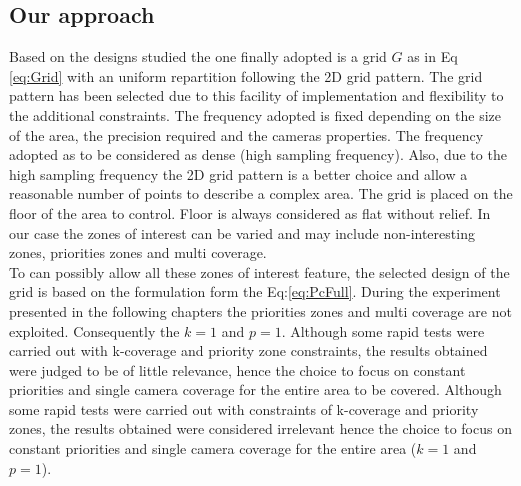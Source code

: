 \begin{landscape}
\begin{table}[!h]
 \caption{Sum-up of the grid map.}\label{tab:mapSumUp}
\end{table}	
\end{landscape}
 
\subsection{Our approach}
 Based on the designs studied the one finally adopted is a grid $G$ as in Eq \ref{eq:Grid} with an uniform repartition following the 2D grid pattern. The grid pattern has been selected due to this facility of implementation and  flexibility to the additional constraints.
  The frequency adopted is fixed depending on the size of the area, the precision required and the cameras properties. The frequency adopted as to be considered as dense (high sampling frequency).
  Also, due to the high sampling frequency the 2D grid pattern is a better choice and allow a reasonable number of points to describe a complex area. 
  The grid is placed on the floor of the area to control. Floor is always considered as flat without relief.
  In our case the zones of interest can be varied and may include non-interesting zones, priorities zones  and  multi coverage. \\
  To can possibly allow all these zones of interest feature, the selected design of the grid is based on the formulation form the Eq:\ref{eq:PcFull}. During the experiment presented in the following  chapters the priorities zones and multi coverage are not exploited. Consequently the $k=1$ and $p=1$.  Although some rapid tests were carried out with k-coverage and priority zone constraints, the results obtained were judged to be of little relevance, hence the choice to focus on constant priorities and single camera coverage for the entire area to be covered.
 Although some rapid tests were carried out with constraints of k-coverage and priority zones, the results obtained were considered irrelevant hence the choice to focus on constant priorities and single camera coverage for the entire area ($k=1$ and $p=1$).

